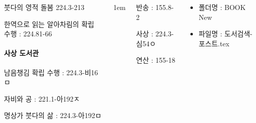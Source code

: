\documentclass[	17pt, 
							a1paper, 
							portrait, %
							margin=0mm, %
							innermargin=10mm,  		%
							blockverticalspace=4mm, %
							colspace=5mm, 
							subcolspace=0mm
							]{tikzposter}
\begin{document}
\begin{columns}
{\begin{LARGE}
		붓다의 영적 돌봄 224.3-213

		한역으로 읽는 알아차림의 확립 수행 : 224.81-66

		\paragraph{사상 도서관}

		남음챙김 확립 수행 : 224.3-비16ㅁ

		자비와 공 : 221.1-아192ㅈ

		명상가 붓다의 삶 : 224.3-아192ㅁ

				\end{LARGE}
			} %


			{
					\setlength{\leftmargini}{4em}
					\setlength{\labelsep} {1em}
				\begin{LARGE}
반송  : 155.8-2  %

사상  :  224.3-심54ㅇ %

연산  :  155-18    %



				\end{LARGE}
			}

			{
				\begin{LARGE}
					\begin{itemize}
					\item 폴더명 : BOOK New
					\item 파일명 : 도서검색-포스트.tex
					\end{itemize}
				\end{LARGE}
			}


	\end{columns}
\end{document}
